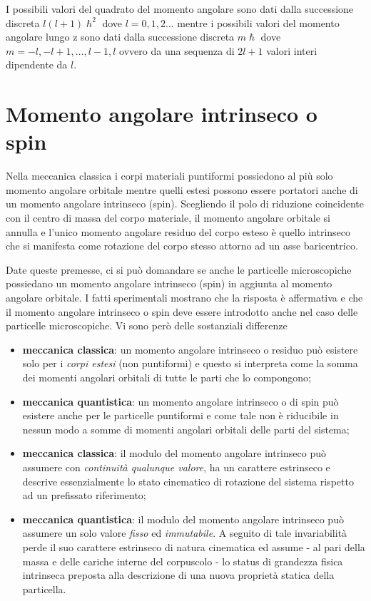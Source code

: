 I possibili valori del quadrato del momento angolare sono dati dalla
successione discreta \(l(l+1) \hslash^{2}\) dove \(l=0,1,2 \dots\)
mentre i possibili valori del momento angolare lungo z sono dati dalla
successione discreta \(m \hslash\) dove
\(m = -l, -l + 1, \dots, l-1, l\) ovvero da una sequenza di \(2l+1\)
valori interi dipendente da \(l\).

\section{Momento angolare intrinseco o spin}\label{sec:momento-angolare-intrinseco-o-spin}

Nella meccanica classica i corpi materiali puntiformi possiedono al più
solo momento angolare orbitale mentre quelli estesi possono essere
portatori anche di un momento angolare intrinseco (spin).
Scegliendo il
polo di riduzione coincidente con il centro di massa del corpo
materiale, il momento angolare orbitale si annulla e l'unico momento
angolare residuo del corpo esteso è quello intrinseco che si manifesta
come rotazione del corpo stesso attorno ad un asse baricentrico.

Date queste premesse, ci si può domandare se anche le particelle
microscopiche possiedano un momento angolare intrinseco (spin) in
aggiunta al momento angolare orbitale.
I fatti sperimentali mostrano che
la risposta è affermativa e che il momento angolare intrinseco o spin
deve essere introdotto anche nel caso delle particelle microscopiche.
Vi
sono però delle sostanziali differenze

\begin{itemize}
    \tightlist
    \item
    \textbf{meccanica classica}: un momento angolare intrinseco o residuo
    può esistere solo per i \emph{corpi estesi} (non puntiformi) e questo
    si interpreta come la somma dei momenti angolari orbitali di tutte le
    parti che lo compongono;
    \item
    \textbf{meccanica quantistica}: un momento angolare intrinseco o di
    spin può esistere anche per le particelle puntiformi e come tale non è
    riducibile in nessun modo a somme di momenti angolari orbitali delle
    parti del sistema;
    \item
    \textbf{meccanica classica}: il modulo del momento angolare intrinseco
    può assumere con \emph{continuità qualunque valore}, ha un carattere
    estrinseco e descrive essenzialmente lo stato cinematico di rotazione
    del sistema rispetto ad un prefissato riferimento;
    \item
    \textbf{meccanica quantistica}: il modulo del momento angolare
    intrinseco può assumere un solo valore \emph{fisso} ed
    \emph{immutabile}.
    A seguito di tale invariabilità perde il suo
    carattere estrinseco di natura cinematica ed assume - al pari della
    massa e delle cariche interne del corpuscolo - lo status di grandezza
    fisica intrinseca preposta alla descrizione di una nuova proprietà
    statica della particella.
\end{itemize}

